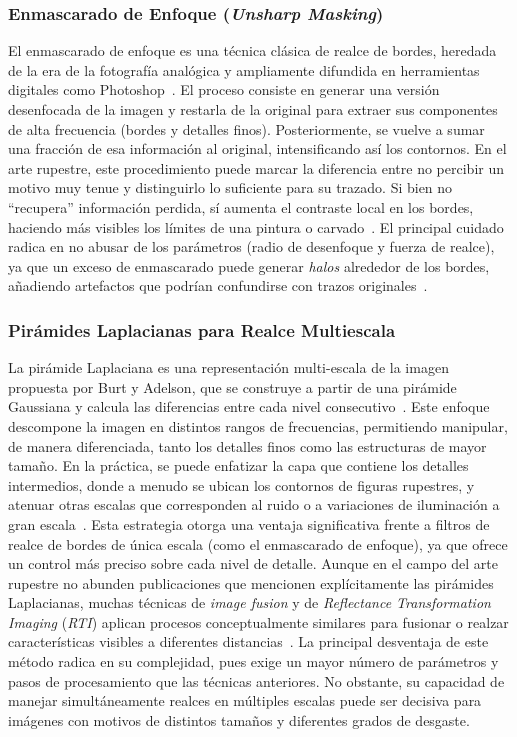 \subsubsection{Enmascarado de Enfoque (\textit{Unsharp Masking})}

El enmascarado de enfoque es una técnica clásica de realce de bordes, heredada de la era de la fotografía analógica y ampliamente difundida en herramientas digitales como Photoshop~\cite{adobe_unsharp_masking}.
El proceso consiste en generar una versión desenfocada de la imagen y restarla de la original para extraer sus componentes de alta frecuencia (bordes y detalles finos).
Posteriormente, se vuelve a sumar una fracción de esa información al original, intensificando así los contornos.
En el arte rupestre, este procedimiento puede marcar la diferencia entre no percibir un motivo muy tenue y distinguirlo lo suficiente para su trazado.
Si bien no “recupera” información perdida, sí aumenta el contraste local en los bordes, haciendo más visibles los límites de una pintura o carvado~\cite{xiao2020}.
El principal cuidado radica en no abusar de los parámetros (radio de desenfoque y fuerza de realce), ya que un exceso de enmascarado puede generar \textit{halos} alrededor de los bordes, añadiendo artefactos que podrían confundirse con trazos originales~\cite{adobe_unsharp_masking}.

\subsubsection{Pirámides Laplacianas para Realce Multiescala}

La pirámide Laplaciana es una representación multi-escala de la imagen propuesta por Burt y Adelson, que se construye a partir de una pirámide Gaussiana y calcula las diferencias entre cada nivel consecutivo~\cite{bai2023,zhou2019}.
Este enfoque descompone la imagen en distintos rangos de frecuencias, permitiendo manipular, de manera diferenciada, tanto los detalles finos como las estructuras de mayor tamaño.
En la práctica, se puede enfatizar la capa que contiene los detalles intermedios, donde a menudo se ubican los contornos de figuras rupestres, y atenuar otras escalas que corresponden al ruido o a variaciones de iluminación a gran escala~\cite{paris2008}.
Esta estrategia otorga una ventaja significativa frente a filtros de realce de bordes de única escala (como el enmascarado de enfoque), ya que ofrece un control más preciso sobre cada nivel de detalle.
Aunque en el campo del arte rupestre no abunden publicaciones que mencionen explícitamente las pirámides Laplacianas, muchas técnicas de \textit{image fusion} y de \textit{Reflectance Transformation Imaging} (\textit{RTI}) aplican procesos conceptualmente similares para fusionar o realzar características visibles a diferentes distancias~\cite{zhou2019}.
La principal desventaja de este método radica en su complejidad, pues exige un mayor número de parámetros y pasos de procesamiento que las técnicas anteriores.
No obstante, su capacidad de manejar simultáneamente realces en múltiples escalas puede ser decisiva para imágenes con motivos de distintos tamaños y diferentes grados de desgaste.

